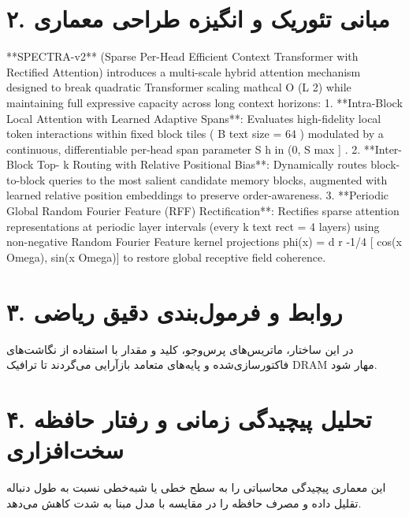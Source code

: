 \documentclass[12pt,a4paper]{article}
\begin{document}
\section*{۲. مبانی تئوریک و انگیزه طراحی معماری}
**SPECTRA-v2** (Sparse Per-Head Efficient Context Transformer with Rectified Attention) introduces a multi-scale hybrid attention mechanism designed to break quadratic Transformer scaling mathcal O (L 2) while maintaining full expressive capacity across long context horizons: 1. **Intra-Block Local Attention with Learned Adaptive Spans**: Evaluates high-fidelity local token interactions within fixed block tiles ( B text size = 64 ) modulated by a continuous, differentiable per-head span parameter S h in (0, S max ] . 2. **Inter-Block Top- k Routing with Relative Positional Bias**: Dynamically routes block-to-block queries to the most salient candidate memory blocks, augmented with learned relative position embeddings to preserve order-awareness. 3. **Periodic Global Random Fourier Feature (RFF) Rectification**: Rectifies sparse attention representations at periodic layer intervals (every k text rect = 4 layers) using non-negative Random Fourier Feature kernel projections phi(x) = d r -1/4 [ cos(x Omega), sin(x Omega)] to restore global receptive field coherence.

\section*{۳. روابط و فرمول‌بندی دقیق ریاضی}
در این ساختار، ماتریس‌های پرس‌وجو، کلید و مقدار با استفاده از نگاشت‌های فاکتورسازی‌شده و پایه‌های متعامد بازآرایی می‌گردند تا ترافیک DRAM مهار شود.

\section*{۴. تحلیل پیچیدگی زمانی و رفتار حافظه سخت‌افزاری}
این معماری پیچیدگی محاسباتی را به سطح خطی یا شبه‌خطی نسبت به طول دنباله تقلیل داده و مصرف حافظه را در مقایسه با مدل مبنا به شدت کاهش می‌دهد.
\end{document}
